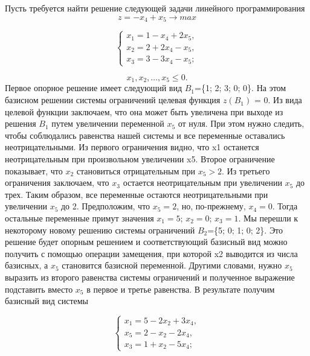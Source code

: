 \documentclass{article}
\begin{document}
Пусть требуется найти решение следующей задачи линейного программирования
$$z = -x_4 + x_5 \rightarrow max$$

\begin{equation*}
\begin{cases}
x_1 = 1 - x_4 +2x_5,\\
x_2 = 2 + 2x_4 - x_5,\\
x_3 = 3 - 3x_4 - x_5;
\end{cases}
\end{equation*}

$$x_1,x_2,\dots,x_5 \leq 0.$$
Первое опорное решение имеет следующий вид $B_1$=\{1; 2; 3; 0; 0\}. На этом базисном решении системы ограничений целевая функция $z(B_1)$ = 0. Из вида целевой функции заключаем, что она может быть увеличена при выходе из решения $B_1$   путем  увеличении переменной $x_5$ от нуля. При этом нужно следить, чтобы соблюдались равенства нашей системы и все переменные оставались неотрицательными. Из первого ограничения видно, что x1 останется неотрицательным при произвольном увеличении x5. Второе ограничение показывает, что $x_2$ становиться отрицательным при $x_5 > 2$. Из третьего ограничения заключаем, что $x_3$ остается неотрицательным при увеличении $x_5$ до трех. Таким образом, все переменные остаются неотрицательными при увеличении $x_5$ до 2. Предположим, что $x_5 =2$, но, по-прежнему, $x_4= 0$. Тогда остальные переменные примут значения $x_1= 5$; $x_2= 0$; $x_3 = 1$. Мы перешли к некоторому новому решению системы ограничений $B_2$=\{5; 0; 1; 0; 2\}. Это решение будет опорным решением и соответствующий базисный вид можно получить с помощью операции замещения, при которой x2 выводится из числа базисных, а $x_5$ становится базисной переменной. Другими словами, нужно $x_5$ выразить из второго равенства системы ограничений и полученное выражение подставить вместо $x_5$ в первое и третье равенства. В результате получим базисный вид системы

\begin{equation*}
\begin{cases}
x_1 = 5 - 2x_2 + 3x_4,\\
x_5 = 2 - x_2 - 2x_4,\\
x_3 = 1 + x_2 - 5x_4;
\end{cases}
\end{equation*}
\end{document}

